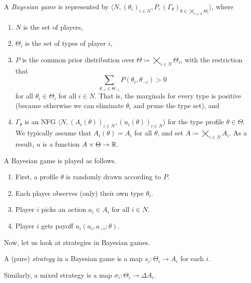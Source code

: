 	\begin{fdef}
		A \emph{Bayesian game} is represented by $\langle N , (\theta_i)_{i \in N} , P , (\Gamma_\theta)_{\theta \in \bigtimes_{i \in N} \Theta_i} \rangle$, where
		\begin{enumerate}
			\item $N$ is the set of players,
			\item $\Theta_i$ is the set of types of player $i$,
			\item $P$ is the common prior distribution over $\Theta \coloneqq \bigtimes_{i \in N} \Theta_i$, with the restriction that
			\[ \sum_{\theta_{-i} \in \Theta_{-i}} P(\theta_i,\theta_{-i}) > 0 \]
			for all $\theta_i \in \Theta_i$ for all $i \in N$. That is, the marginals for every type is positive (because otherwise we can eliminate $\theta_i$ and prune the type set), and
			\item $\Gamma_\theta$ is an NFG $\langle N , (A_i(\theta))_{i \in N} , (u_i(\theta))_{i \in N} \rangle$ for the type profile $\theta \in \Theta$. We typically assume that $A_i (\theta) = A_i$ for all $\theta$, and set $A \coloneqq \bigtimes_{i \in N} A_i$. As a result, $u$ is a function $A \times \Theta \to \mathbb{R}$.
		\end{enumerate}
	\end{fdef}

	A Bayesian game is played as follows.
	\begin{enumerate}
		\item First, a profile $\theta$ is randomly drawn according to $P$.
		\item Each player observes (only) their own type $\theta_i$.
		\item Player $i$ picks an action $a_i \in A_i$ for all $i \in N$.
		\item Player $i$ gets payoff $u_i(a_i,a_{-i};\theta)$.
	\end{enumerate}

	Now, let us look at strategies in Bayesian games.

	\begin{fdef}
		A (pure) \emph{strategy} in a Bayesian game is a map $s_i : \Theta_i \to A_i$ for each $i$.
	\end{fdef}

	Similarly, a mixed strategy is a map $\sigma_i : \Theta_i \to \Delta A_i$.


